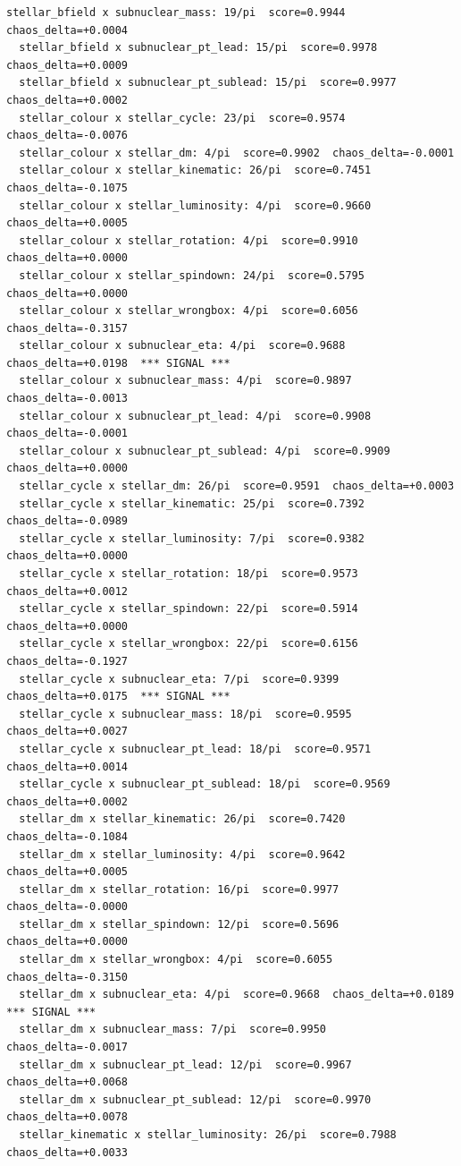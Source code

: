 \documentclass[11pt, letterpaper, openany]{book}
\begin{document}
\begin{empiricalbox}
\begin{lstlisting}[style=terminal]
  stellar_bfield x subnuclear_mass: 19/pi  score=0.9944  chaos_delta=+0.0004
  stellar_bfield x subnuclear_pt_lead: 15/pi  score=0.9978  chaos_delta=+0.0009
  stellar_bfield x subnuclear_pt_sublead: 15/pi  score=0.9977  chaos_delta=+0.0002
  stellar_colour x stellar_cycle: 23/pi  score=0.9574  chaos_delta=-0.0076
  stellar_colour x stellar_dm: 4/pi  score=0.9902  chaos_delta=-0.0001
  stellar_colour x stellar_kinematic: 26/pi  score=0.7451  chaos_delta=-0.1075
  stellar_colour x stellar_luminosity: 4/pi  score=0.9660  chaos_delta=+0.0005
  stellar_colour x stellar_rotation: 4/pi  score=0.9910  chaos_delta=+0.0000
  stellar_colour x stellar_spindown: 24/pi  score=0.5795  chaos_delta=+0.0000
  stellar_colour x stellar_wrongbox: 4/pi  score=0.6056  chaos_delta=-0.3157
  stellar_colour x subnuclear_eta: 4/pi  score=0.9688  chaos_delta=+0.0198  *** SIGNAL ***
  stellar_colour x subnuclear_mass: 4/pi  score=0.9897  chaos_delta=-0.0013
  stellar_colour x subnuclear_pt_lead: 4/pi  score=0.9908  chaos_delta=-0.0001
  stellar_colour x subnuclear_pt_sublead: 4/pi  score=0.9909  chaos_delta=+0.0000
  stellar_cycle x stellar_dm: 26/pi  score=0.9591  chaos_delta=+0.0003
  stellar_cycle x stellar_kinematic: 25/pi  score=0.7392  chaos_delta=-0.0989
  stellar_cycle x stellar_luminosity: 7/pi  score=0.9382  chaos_delta=+0.0000
  stellar_cycle x stellar_rotation: 18/pi  score=0.9573  chaos_delta=+0.0012
  stellar_cycle x stellar_spindown: 22/pi  score=0.5914  chaos_delta=+0.0000
  stellar_cycle x stellar_wrongbox: 22/pi  score=0.6156  chaos_delta=-0.1927
  stellar_cycle x subnuclear_eta: 7/pi  score=0.9399  chaos_delta=+0.0175  *** SIGNAL ***
  stellar_cycle x subnuclear_mass: 18/pi  score=0.9595  chaos_delta=+0.0027
  stellar_cycle x subnuclear_pt_lead: 18/pi  score=0.9571  chaos_delta=+0.0014
  stellar_cycle x subnuclear_pt_sublead: 18/pi  score=0.9569  chaos_delta=+0.0002
  stellar_dm x stellar_kinematic: 26/pi  score=0.7420  chaos_delta=-0.1084
  stellar_dm x stellar_luminosity: 4/pi  score=0.9642  chaos_delta=+0.0005
  stellar_dm x stellar_rotation: 16/pi  score=0.9977  chaos_delta=-0.0000
  stellar_dm x stellar_spindown: 12/pi  score=0.5696  chaos_delta=+0.0000
  stellar_dm x stellar_wrongbox: 4/pi  score=0.6055  chaos_delta=-0.3150
  stellar_dm x subnuclear_eta: 4/pi  score=0.9668  chaos_delta=+0.0189  *** SIGNAL ***
  stellar_dm x subnuclear_mass: 7/pi  score=0.9950  chaos_delta=-0.0017
  stellar_dm x subnuclear_pt_lead: 12/pi  score=0.9967  chaos_delta=+0.0068
  stellar_dm x subnuclear_pt_sublead: 12/pi  score=0.9970  chaos_delta=+0.0078
  stellar_kinematic x stellar_luminosity: 26/pi  score=0.7988  chaos_delta=+0.0033

\end{lstlisting}
\end{empiricalbox}
\end{document}
